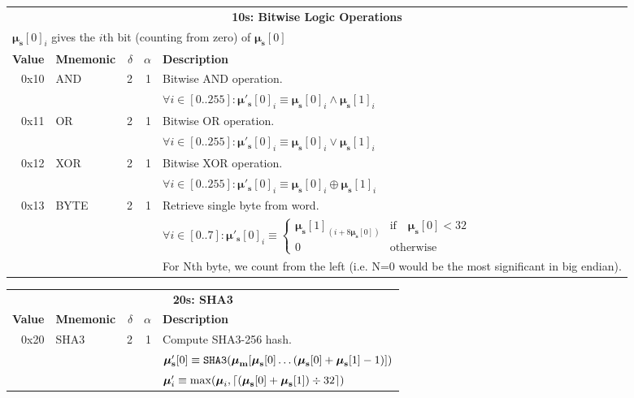 \documentclass[9pt,oneside]{amsart}
\DeclarePairedDelimiter{\ceil}{\lceil}{\rceil}
\begin{document}
\begin{tabular*}{\columnwidth}[h]{rlrrl}
\toprule
\multicolumn{5}{c}{\textbf{10s: Bitwise Logic Operations}} \\
\multicolumn{5}{l}{$\boldsymbol{\mu}_\mathbf{s}[0]_i$ gives the $i$th bit (counting from zero) of $\boldsymbol{\mu}_\mathbf{s}[0]$} \vspace{5pt} \\
\textbf{Value} & \textbf{Mnemonic} & $\delta$ & $\alpha$ & \textbf{Description} \vspace{5pt} \\
0x10 & {\small AND} & 2 & 1 & Bitwise AND operation. \\
&&&& $\forall i \in [0..255]: \boldsymbol{\mu}'_\mathbf{s}[0]_i \equiv \boldsymbol{\mu}_\mathbf{s}[0]_i \wedge \boldsymbol{\mu}_\mathbf{s}[1]_i$ \\
\midrule
0x11 & {\small OR} & 2 & 1 & Bitwise OR operation. \\
&&&& $\forall i \in [0..255]: \boldsymbol{\mu}'_\mathbf{s}[0]_i \equiv \boldsymbol{\mu}_\mathbf{s}[0]_i \vee \boldsymbol{\mu}_\mathbf{s}[1]_i$ \\
\midrule
0x12 & {\small XOR} & 2 & 1 & Bitwise XOR operation. \\
&&&& $\forall i \in [0..255]: \boldsymbol{\mu}'_\mathbf{s}[0]_i \equiv \boldsymbol{\mu}_\mathbf{s}[0]_i \oplus \boldsymbol{\mu}_\mathbf{s}[1]_i$ \\
\midrule
0x13 & {\small BYTE} & 2 & 1 & Retrieve single byte from word. \\
&&&& $\forall i \in [0..7]: \boldsymbol{\mu}'_\mathbf{s}[0]_i \equiv \begin{cases} \boldsymbol{\mu}_\mathbf{s}[1]_{(i + 8\boldsymbol{\mu}_\mathbf{s}[0])} & \text{if} \quad \boldsymbol{\mu}_\mathbf{s}[0] < 32 \\ 0 & \text{otherwise} \end{cases} $\\
&&&& For Nth byte, we count from the left (i.e. N=0 would be the most significant in big endian). \\
\bottomrule
\end{tabular*}

\begin{tabular*}{\columnwidth}[h]{rlrrl}
\toprule
\multicolumn{5}{c}{\textbf{20s: SHA3}} \vspace{5pt} \\
\textbf{Value} & \textbf{Mnemonic} & $\delta$ & $\alpha$ & \textbf{Description} \vspace{5pt} \\
0x20 & {\small SHA3} & 2 & 1 & Compute SHA3-256 hash. \\
&&&& $\boldsymbol{\mu}'_\mathbf{s}[0] \equiv \mathtt{\tiny SHA3}(\boldsymbol{\mu}_\mathbf{m}[ \boldsymbol{\mu}_\mathbf{s}[0] \dots (\boldsymbol{\mu}_\mathbf{s}[0] + \boldsymbol{\mu}_\mathbf{s}[1] - 1) ])$ \\
&&&& $\boldsymbol{\mu}'_i \equiv \max(\boldsymbol{\mu}_i, \ceil{ (\boldsymbol{\mu}_\mathbf{s}[0] + \boldsymbol{\mu}_\mathbf{s}[1]) \div 32 })$ \\
\bottomrule
\end{tabular*}
\end{document}

